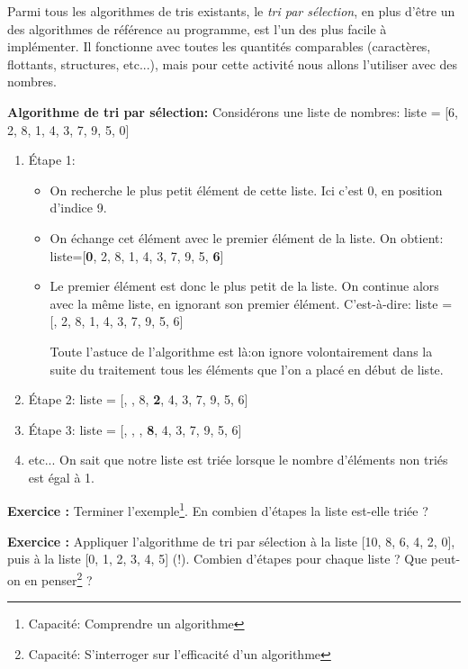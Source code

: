 \documentclass{article}
\newcounter{exo}
\newcommand{\exercice}{
\stepcounter{exo}
\noindent\textbf{Exercice \theexo :}
}
\begin{document}
\smallskip

Parmi tous les algorithmes de tris existants, le \emph{tri par sélection}, en plus d'être un des algorithmes de référence au programme, est l'un des plus facile à implémenter. Il fonctionne avec toutes les quantités comparables (caractères, flottants, structures, etc...), mais pour cette activité nous allons l'utiliser avec des nombres.

\textbf{Algorithme de tri par sélection: }Considérons une liste de nombres: liste = [6, 2, 8, 1, 4, 3, 7, 9, 5, 0]
\begin{enumerate}
\setlength{\itemsep}{1pt}
     \setlength{\parskip}{0pt}
     \setlength{\parsep}{0pt}
	\item \'Etape 1:\begin{itemize}
\setlength{\itemsep}{1pt}
     \setlength{\parskip}{0pt}
     \setlength{\parsep}{0pt}
	\item On recherche le plus petit élément de cette liste. Ici c'est 0, en position d'indice 9.
	\item On échange cet élément avec le premier élément de la liste.\newline
	On obtient:  liste=[\textbf{0}, 2, 8, 1, 4, 3, 7, 9, 5, \textbf{6}]
	\item Le premier élément est donc le plus petit de la liste. On continue alors avec la même liste, en ignorant son premier élément.\newline
	C'est-à-dire: liste = [, 2, 8, 1, 4, 3, 7, 9, 5, 6]
	\begin{mdframed}
	Toute l'astuce de l'algorithme est là:on ignore volontairement dans la suite du traitement tous les éléments que l'on a placé en début de liste.
	\end{mdframed}
	\end{itemize}
	\item \'Etape 2: liste = [, , 8, \textbf{2}, 4, 3, 7, 9, 5, 6]
	\item \'Etape 3: liste = [, , , \textbf{8}, 4, 3, 7, 9, 5, 6]
	\item etc... On sait que notre liste est triée lorsque le nombre d'éléments non triés est égal à 1.
\end{enumerate}

\exercice Terminer l'exemple\footnote{Capacité: Comprendre un algorithme}. En combien d'étapes la liste est-elle triée ? 

\exercice Appliquer l'algorithme de tri par sélection à la liste [10, 8, 6, 4, 2, 0], puis à la liste [0, 1, 2, 3, 4, 5] (!). Combien d'étapes pour chaque liste ? Que peut-on en penser\footnote{Capacité: S'interroger sur l'efficacité d'un algorithme} ?
\end{document}
